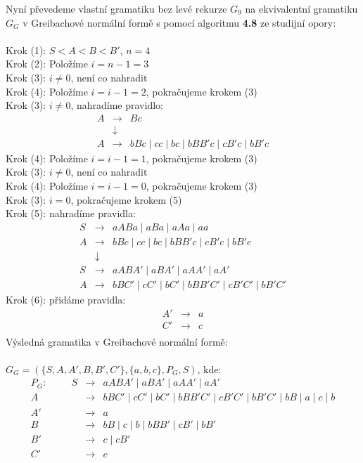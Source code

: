 \documentclass[a4paper,11pt]{article}[24.3.2010]
\begin{document}
\begin{enumerate}
\begin{enumerate}
      \newpage
      Nyní převedeme vlastní gramatiku bez levé rekurze $G_{9}$ na ekvivalentní gramatiku $G_{G}$ v Greibachové normální formě s pomocí algoritmu \textbf{4.8} ze studijní opory:\\\\
      Krok (1): $S < A < B < B'$, $n=4$\\
      Krok (2): Položíme $i = n - 1 = 3$\\
      Krok (3): $i \neq 0$, není co nahradit\\
      Krok (4): Položíme $i = i - 1 = 2$, pokračujeme krokem (3)\\
      Krok (3): $i \neq 0$, nahradíme pravidlo:
      \begin{eqnarray*}
        A&\rightarrow&Bc\\
        &\downarrow&\\
        A&\rightarrow&bBc \mid cc \mid bc \mid bBB'c \mid cB'c \mid bB'c
      \end{eqnarray*}
      Krok (4): Položíme $i = i - 1 = 1$, pokračujeme krokem (3)\\
      Krok (3): $i \neq 0$, není co nahradit\\
      Krok (4): Položíme $i = i - 1 = 0$, pokračujeme krokem (3)\\
      Krok (3): $i = 0$, pokračujeme krokem (5)\\
      Krok (5): nahradíme pravidla:
      \begin{eqnarray*}
       S&\rightarrow&aABa \mid aBa \mid aAa \mid aa\\
       A&\rightarrow&bBc \mid cc \mid bc \mid bBB'c \mid cB'c \mid bB'c\\
        &\downarrow&\\
       S&\rightarrow&aABA' \mid aBA' \mid aAA' \mid aA'\\
       A&\rightarrow&bBC' \mid cC' \mid bC' \mid bBB'C' \mid cB'C' \mid bB'C'
      \end{eqnarray*}
      Krok (6): přidáme pravidla:
      \begin{eqnarray*}
        A'&\rightarrow&a\\
        C'&\rightarrow&c\\
      \end{eqnarray*}
      Výsledná gramatika v Greibachové normální formě:\\\\$G_{G} = (\{S,A,A',B,B',C'\}, \{a,b,c\},P_{G},S)$, kde:
      \begin{eqnarray*}
      P_{G}: \:\:\:\:\:\:\:\:\:\:\: S&\rightarrow&aABA' \mid aBA' \mid aAA' \mid aA'\\
      A&\rightarrow&bBC' \mid cC' \mid bC' \mid bBB'C' \mid cB'C' \mid bB'C' \mid bB \mid a \mid c \mid b\\
      A'&\rightarrow&a\\
      B&\rightarrow&bB \mid c \mid b \mid bBB' \mid cB' \mid bB'\\
      B'&\rightarrow&c \mid cB'\\
      C'&\rightarrow&c\\
      \end{eqnarray*}
      \newpage


\end{enumerate}
\end{enumerate}
\end{document}
